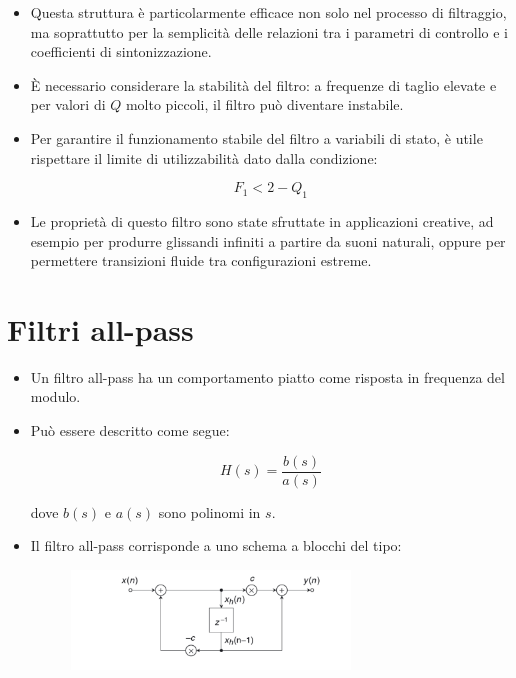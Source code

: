 \begin{itemize}
    \item Questa struttura è particolarmente efficace non solo nel processo di filtraggio, ma soprattutto per la semplicità delle relazioni tra i parametri di controllo e i coefficienti di sintonizzazione.

    \item È necessario considerare la stabilità del filtro: a frequenze di taglio elevate e per valori di $Q$ molto piccoli, il filtro può diventare instabile.

    \item Per garantire il funzionamento stabile del filtro a variabili di stato, è utile rispettare il limite di utilizzabilità dato dalla condizione:
    
    \[
    F_1 < 2 - Q_1
    \]

    \item Le proprietà di questo filtro sono state sfruttate in applicazioni creative, ad esempio per produrre glissandi infiniti a partire da suoni naturali, oppure per permettere transizioni fluide tra configurazioni estreme.
\end{itemize}

\section{Filtri all-pass}

\begin{itemize}
    \item Un filtro all-pass ha un comportamento piatto come risposta in frequenza del modulo.

    \item Può essere descritto come segue:

    \[
    H(s) = \frac{b(s)}{a(s)}
    \]

    dove $b(s)$ e $a(s)$ sono polinomi in $s$.

    \item Il filtro all-pass corrisponde a uno schema a blocchi del tipo:

    \begin{figure}[H]
        \centering
        \includegraphics[width=0.7\textwidth]{capitoli/capitolo15/immagini/image6.png}
    \end{figure}
\end{itemize}


